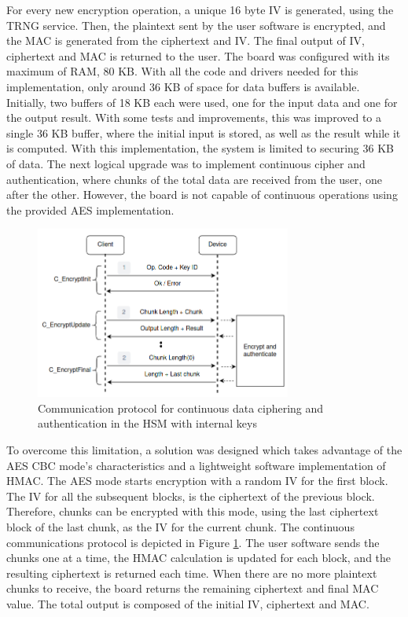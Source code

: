 For every new encryption operation, a unique 16 byte IV is generated, using the TRNG service.
Then, the plaintext sent by the user software is encrypted, and the MAC is generated from the ciphertext and IV. The final output of IV, ciphertext and MAC is returned to the user.
The board was configured with its maximum of RAM, 80 KB. With all the code and drivers needed for this implementation, only around 36 KB of space for data buffers is available. Initially, two buffers of 18 KB each were used, one for the input data and one for the output result. With some tests and improvements, this was improved to a single 36 KB buffer, where the initial input is stored, as well as the result while it is computed. With this implementation, the system is limited to securing 36 KB of data. The next logical upgrade was to implement continuous cipher and authentication, where chunks of the total data are received from the user, one after the other. However, the board is not capable of continuous operations using the provided AES implementation.
\begin{figure}[h!]
	\centering
	\includegraphics[width=0.75\textwidth]{./Images/data-exchange-chunks.png}
	\caption{Communication protocol for continuous data ciphering and authentication in the HSM with internal keys}
	\label{fig:protocol:data-exchange-chunks}
\end{figure}
To overcome this limitation, a solution was designed which takes advantage of the AES CBC mode's characteristics and a lightweight software implementation of HMAC. The AES mode starts encryption with a random IV for the first block. The IV for all the subsequent blocks, is the ciphertext of the previous block. Therefore, chunks can be encrypted with this mode, using the last ciphertext block of the last chunk, as the IV for the current chunk. The continuous communications protocol is depicted in Figure \ref{fig:protocol:data-exchange-chunks}. The user software sends the chunks one at a time, the HMAC calculation is updated for each block, and the resulting ciphertext is returned each time. When there are no more plaintext chunks to receive, the board returns the remaining ciphertext and final MAC value. The total output is composed of the initial IV, ciphertext and MAC.
